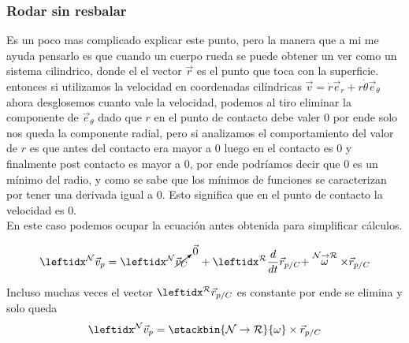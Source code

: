 \subsubsection{Rodar sin resbalar}
Es un poco mas complicado explicar este punto, pero la manera que a mi me ayuda pensarlo es que cuando un cuerpo rueda se puede obtener un ver como un sistema cilindrico, donde el el vector $\Vec{r}$ es el punto que toca con la superficie. entonces si utilizamos la velocidad en coordenadas cilíndricas $\Vec{v}=\dot r\Vec{e}_r+r\dot {\theta}\Vec{e}_{\theta}$ ahora desglosemos cuanto vale la velocidad, podemos al tiro eliminar la componente de $\Vec{e}_{\theta}$ dado que $r$ en el punto de contacto debe valer 0 por ende solo nos queda la componente radial, pero si analizamos el comportamiento del valor de $r$ es que antes del contacto era mayor a 0 luego en el contacto es 0 y finalmente post contacto es mayor a 0, por ende podríamos decir que 0 es un mínimo del radio, y como se sabe que los mínimos de funciones se caracterizan por tener una derivada igual a 0. Esto significa que en el punto de contacto la velocidad es 0.\\
En este caso podemos ocupar la ecuación antes obtenida para simplificar cálculos.


\begin{equation}
    \marc{\Vec{v}_p}{N}=\marc{\cancelto{\Vec{0}}{\Vec{v}_C}}{N} \quad+ \transporta{\Vec{r}_{p/C}}{N}{R}
\end{equation}

Incluso muchas veces el vector $\marc{\Vec{r}_{p/C}}{R}$ es constante por ende se elimina y solo queda
$$\marc{\Vec{v}_p}{N}=\stackbin{\mathcal{N}\to \mathcal{R}}{\omega}\times \Vec{r}_{p/C}$$

